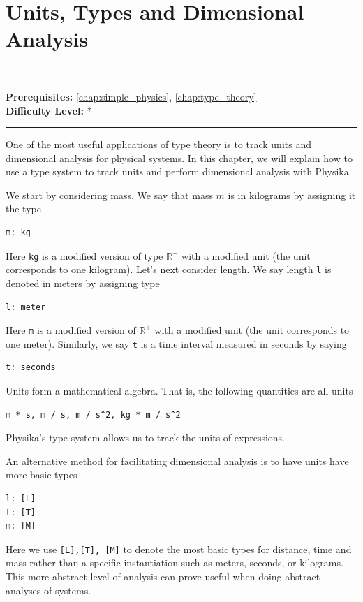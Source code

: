 \documentclass[book.tex]{subfiles}
\begin{document}
\chapter{Units, Types and Dimensional Analysis}
\label{chap:units_and_types}
\noindent\rule{11cm}{0.4pt} \\
\textbf{Prerequisites:} \autoref{chap:simple_physics}, \autoref{chap:type_theory} \\
\textbf{Difficulty Level:} * \\
\noindent\rule{11cm}{0.4pt}
\vspace{5mm}

One of the most useful applications of type theory is to track units and dimensional analysis for physical systems. In this chapter, we will explain how to use a type system to track units and perform dimensional analysis with Physika.

We start by considering mass. We say that mass $m$ is in kilograms by assigning it the type
\begin{lstlisting}
m: kg
\end{lstlisting}
Here \lstinline{kg} is a modified version of type $\mathbb{R}^+$ with a modified unit (the unit corresponds to one kilogram). Let's next consider length. We say length \lstinline{l} is denoted in meters by assigning type
\begin{lstlisting}
l: meter
\end{lstlisting}
Here \lstinline{m} is a modified version of $\mathbb{R}^+$ with a modified unit (the unit corresponds to one meter). Similarly, we say \lstinline{t} is a time interval measured in seconds by saying
\begin{lstlisting}
t: seconds
\end{lstlisting}
Units form a mathematical algebra. That is, the following quantities are all units
\begin{lstlisting}
m * s, m / s, m / s^2, kg * m / s^2
\end{lstlisting}
Physika's type system allows us to track the units of expressions.

An alternative method for facilitating dimensional analysis is to have units have more basic types

\begin{lstlisting}
l: [L]
t: [T]
m: [M]
\end{lstlisting}

Here we use \lstinline{[L],[T], [M]} to denote the most basic types for distance, time and mass rather than a specific instantiation such as meters, seconds, or kilograms. This more abstract level of analysis can prove useful when doing abstract analyses of systems.
\end{document}
